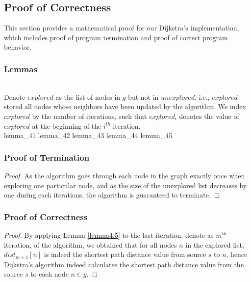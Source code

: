 \subsection{Proof of Correctness} \label{mproof}
This section provides a mathematical proof for our Dijkstra's implementation, which includes proof of program termination and proof of correct program behavior.

\subsubsection{Lemmas} \label{lemmasM}
\tab\\
Denote $explored$ as the list of nodes in $g$ but not in $unexplored$, i.e., $explored$ stored all nodes whose neighbors have been updated by the algorithm. We index $explored$ by the number of iterations, such that $explored_i$ denotes the value of $explored$ at the beginning of the $i^{th}$ iteration.
\tab\\
{lemma_41}
{lemma_42}
{lemma_43}
{lemma_44}
{lemma_45}
{}
\subsubsection{Proof of Termination} 
\begin{proof}{}
As the algorithm goes through each node in the graph exactly once when exploring one particular node, and as the size of the unexplored list decreases by one during each iterations, the algorithm is guaranteed to terminate. 
\end{proof}

\subsubsection{Proof of Correctness}
\begin{proof}
By applying Lemma \ref{lemma4.5} to the last iteration, denote as $m^{th}$ iteration, of the algorithm, we obtained that for all nodes $n$ in the explored list, $dist_{m+1}[n]$ is indeed the shortest path distance value from source $s$ to $n$, hence Dijkstra's algorithm indeed calculates the shortest path distance value from the source $s$ to each node $n \in g$. 
\end{proof}